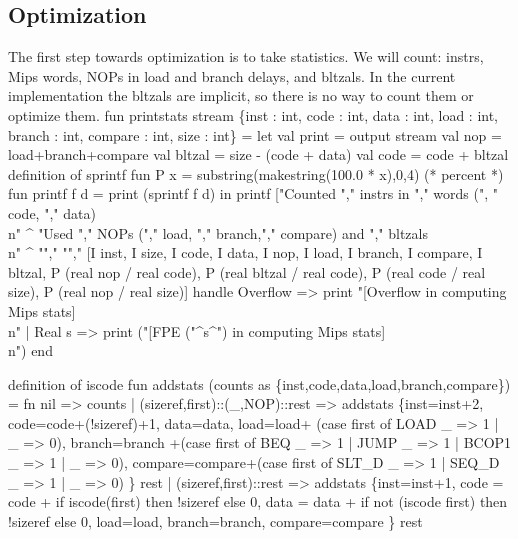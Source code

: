 \enddocs
{}
\subsection{Optimization}
The first step towards optimization is to take statistics.
We will count: \code{}instrs\edoc{}, Mips words, \code{}NOP\edoc{}s in load and branch delays,
and \code{}bltzal\edoc{}s.
In the current implementation the \code{}bltzal\edoc{}s are implicit, so there
is no way to count them or optimize them.
\enddocs
{}
\endmoddef
fun printstats stream
 \{inst : int, code : int, data : int, 
  load : int, branch : int, compare : int, size : int\} =
    let val print = output stream
        val nop = load+branch+compare
        val bltzal = size - (code + data)
        val code = code + bltzal
        \LA{}definition of \code{}sprintf\edoc{}\RA{}
        fun P x = substring(makestring(100.0 * x),0,4)  (* percent *)
        fun printf f d = print (sprintf f d)
    in  printf ["Counted "," instrs in "," words (",
                                " code, "," data)\\n" ^
                "Used "," NOPs ("," load, "," branch,"," compare) and "," bltzals\\n" ^
                "","%
                "","%
               [I inst, I size, I code, I data, 
                I nop, I load, I branch,  I compare, I bltzal,
                P (real nop / real code), P (real bltzal / real code),
                P (real code / real size), P (real nop / real size)]
        handle Overflow => print "[Overflow in computing Mips stats]\\n"
             | Real s => print ("[FPE ("^s^") in computing Mips stats]\\n")
    end
                
\endcode
{}
\endmoddef
\LA{}definition of \code{}iscode\edoc{}\RA{}
fun addstats (counts as \{inst,code,data,load,branch,compare\}) =
  fn nil => counts
   | (sizeref,first)::(_,NOP)::rest => addstats
          \{inst=inst+2, code=code+(!sizeref)+1, data=data,
           load=load+ (case first of LOAD _ => 1 | _ => 0),
           branch=branch +(case first of BEQ _ => 1 | JUMP _ => 1 
                                       | BCOP1 _ => 1 | _ => 0),
           compare=compare+(case first of SLT_D _ => 1 | SEQ_D _ => 1 
                                        | _ => 0)
          \} rest
   | (sizeref,first)::rest => addstats
          \{inst=inst+1, 
           code = code + if iscode(first) then !sizeref else 0,
           data = data + if not (iscode first) then !sizeref else 0,
           load=load,
           branch=branch,
           compare=compare
          \} rest


